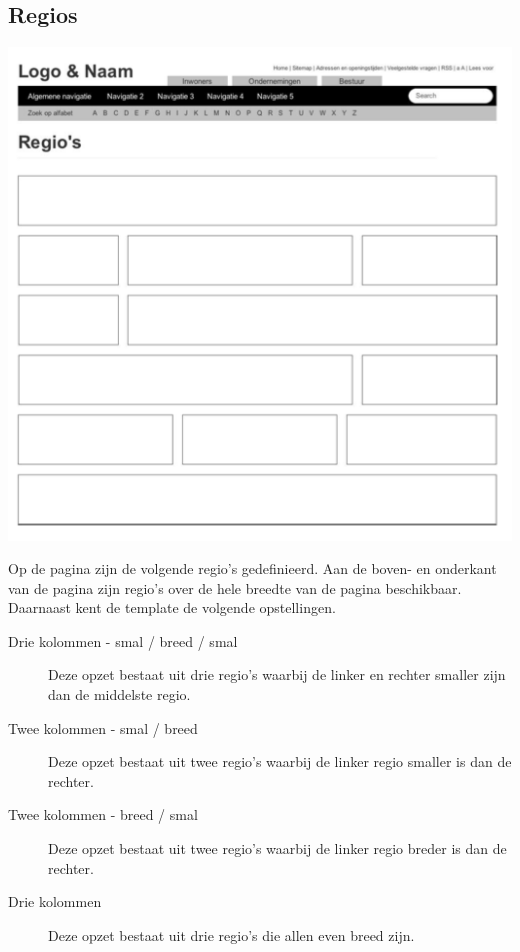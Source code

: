 \subsection{Regios}
\label{sec:regios}

\begin{center}
\includegraphics[scale=.5]{img/regions.png}
\end{center}

Op de pagina zijn de volgende regio's gedefinieerd. Aan de boven- en onderkant van de pagina zijn regio's over de hele breedte van de pagina beschikbaar. Daarnaast kent de template de volgende opstellingen.

\begin{description}
\item[Drie kolommen - smal / breed / smal] Deze opzet bestaat uit drie regio's waarbij de linker en rechter smaller zijn dan de middelste regio.
\item[Twee kolommen - smal / breed] Deze opzet bestaat uit twee regio's waarbij de linker regio smaller is dan de rechter.
\item[Twee kolommen - breed / smal] Deze opzet bestaat uit twee regio's waarbij de linker regio breder is dan de rechter.
\item[Drie kolommen] Deze opzet bestaat uit drie regio's die allen even breed zijn.
\end{description}